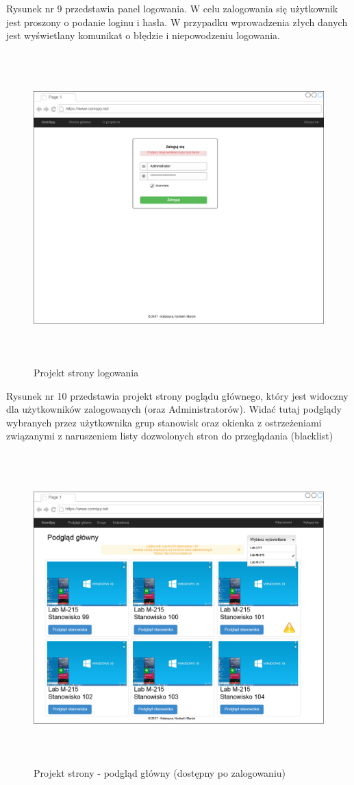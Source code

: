 \newpage
Rysunek nr 9 przedstawia panel logowania. W celu zalogowania się użytkownik jest proszony o podanie loginu i hasła. W przypadku wprowadzenia złych danych jest wyświetlany komunikat o błędzie i niepowodzeniu logowania.
\begin{figure} [!ht]
    \centering
    \includegraphics[height=12cm,width=15cm]{interfejs_zaloguj}
    \caption{Projekt strony logowania}
    \label{fig:my_label}
\end{figure}

\newpage
Rysunek nr 10 przedstawia projekt strony poglądu głównego, który jest widoczny dla użytkowników zalogowanych (oraz Administratorów). Widać tutaj podglądy wybranych przez użytkownika grup stanowisk oraz okienka z ostrzeżeniami związanymi z naruszeniem listy dozwolonych stron do przeglądania (blacklist)
\begin{figure} [!ht]
    \centering
    \includegraphics[height=12cm,width=15cm]{interfejs_podglad_glowny}
    \caption{Projekt strony - podgląd główny (dostępny po zalogowaniu)}
    \label{fig:my_label}
\end{figure}



